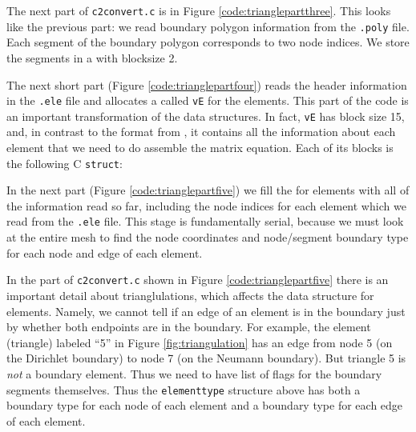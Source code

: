 
The next part of \texttt{c2convert.c} is in Figure \ref{code:trianglepartthree}.  This looks like the previous part: we read boundary polygon information from the \texttt{.poly} file.  Each segment of the boundary polygon corresponds to two node indices.  We store the segments in a \pVec with blocksize 2.


The next short part (Figure \ref{code:trianglepartfour}) reads the header information in the \texttt{.ele} file and allocates a \pVec called \texttt{vE} for the elements.  This part of the code is an important transformation of the data structures.  In fact, \texttt{vE} has block size 15, and, in contrast to the format from \Triangle, it contains all the information about each element that we need to do assemble the matrix equation.  Each of its blocks is the following C \texttt{struct}:
\newcommand*\FancyVerbStartString{//STARTSTRUCT}
\newcommand*\FancyVerbStopString{//ENDSTRUCT}
\let\FancyVerbStartString\relax
\let\FancyVerbStopString\relax


In the next part (Figure \ref{code:trianglepartfive}) we fill the \pVec for elements with all of the information read so far, including the node indices for each element which we read from the \texttt{.ele} file.  This stage is fundamentally serial, because we must look at the entire mesh to find the node coordinates and node/segment boundary type for each node and edge of each element.


In the part of \texttt{c2convert.c} shown in Figure \ref{code:trianglepartfive} there is an important detail about trianglulations, which affects the data structure for elements.  Namely, we cannot tell if an edge of an element is in the boundary just by whether both endpoints are in the boundary.  For example, the element (triangle) labeled ``5'' in Figure \ref{fig:triangulation} has an edge from node 5 (on the Dirichlet boundary) to node 7 (on the Neumann boundary).  But triangle 5 is \emph{not} a boundary element.  Thus we need to have list of flags for the boundary segments themselves.  Thus the \texttt{elementtype} structure above has both a boundary type for each node of each element and a boundary type for each edge of each element.

